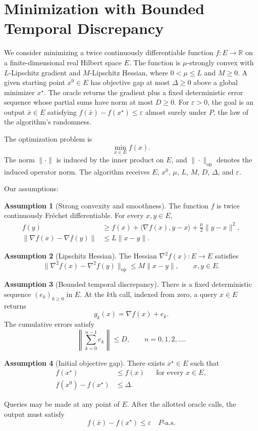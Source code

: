 \documentclass[10pt]{article}
\theoremstyle{definition}
\newtheorem{assumption}{Assumption}
\begin{document}
\section*{Minimization with Bounded Temporal Discrepancy}
We consider minimizing a twice continuously differentiable function $f:E\to\mathbb{R}$ on a finite-dimensional real Hilbert space $E$. The function is $\mu$-strongly convex with $L$-Lipschitz gradient and $M$-Lipschitz Hessian, where $0<\mu\leq L$ and $M\geq0$. A given starting point $x^0\in E$ has objective gap at most $\Delta\geq0$ above a global minimizer $x^\star$. The oracle returns the gradient plus a fixed deterministic error sequence whose partial sums have norm at most $D\geq0$. For $\varepsilon>0$, the goal is an output $\bar{x}\in E$ satisfying $f(\bar{x})-f(x^\star)\leq\varepsilon$ almost surely under $P$, the law of the algorithm's randomness.

The optimization problem is
\[
\min_{x\in E} f(x).
\]
The norm $\|\cdot\|$ is induced by the inner product on $E$, and $\|\cdot\|_{\mathrm{op}}$ denotes the induced operator norm. The algorithm receives $E$, $x^0$, $\mu$, $L$, $M$, $D$, $\Delta$, and $\varepsilon$.

Our assumptions:
\begin{assumption}[Strong convexity and smoothness]
The function $f$ is twice continuously Fr\'echet differentiable. For every $x,y\in E$,
\[
\begin{aligned}
f(y)&\geq f(x)+\langle\nabla f(x),y-x\rangle
       +\frac{\mu}{2}\|y-x\|^2,\\
\|\nabla f(x)-\nabla f(y)\|&\leq L\|x-y\|.
\end{aligned}
\]
\end{assumption}

\begin{assumption}[Lipschitz Hessian]
The Hessian $\nabla^2 f(x):E\to E$ satisfies
\[
\|\nabla^2 f(x)-\nabla^2 f(y)\|_{\mathrm{op}}
\leq M\|x-y\|,
\qquad x,y\in E.
\]
\end{assumption}

\begin{assumption}[Bounded temporal discrepancy]
There is a fixed deterministic sequence $(e_k)_{k\geq0}$ in $E$. At the $k$th call, indexed from zero, a query $x\in E$ returns
\[
g_k(x)=\nabla f(x)+e_k.
\]
The cumulative errors satisfy
\[
\left\|\sum_{k=0}^{n-1}e_k\right\|\leq D,
\qquad n=0,1,2,\ldots.
\]
\end{assumption}

\begin{assumption}[Initial objective gap]
There exists $x^\star\in E$ such that
\[
\begin{aligned}
f(x^\star)&\leq f(x) &&\text{for every }x\in E,\\
f(x^0)-f(x^\star)&\leq\Delta.
\end{aligned}
\]
\end{assumption}

Queries may be made at any point of $E$. After the allotted oracle calls, the output must satisfy
\[
f(\bar{x})-f(x^\star)\leq\varepsilon
\quad P\text{-a.s.}
\]
\end{document}
